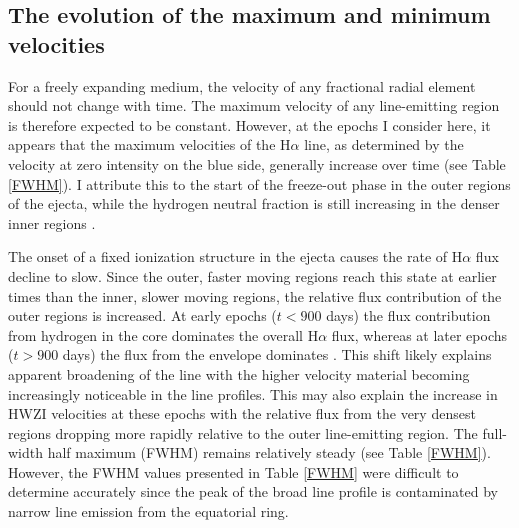 \subsection{The evolution of the maximum and minimum velocities}

For a freely expanding medium, the velocity of any fractional radial 
element should not change with time.  The maximum velocity of any 
line-emitting region is therefore expected to be constant.  However, at 
the epochs I consider here, it appears that the maximum velocities of the 
H$\alpha$ line, as determined by the velocity at zero intensity on the 
blue side, generally increase over time (see Table \ref{FWHM}).  I 
attribute this to the start of the freeze-out phase in the outer regions 
of the ejecta, while the hydrogen neutral fraction is still increasing in 
the denser inner regions \citep{Danziger1991,Fransson1993}.

The onset of a fixed ionization structure in the ejecta causes the rate of 
H$\alpha$ flux decline to slow.  Since the outer, faster moving regions 
reach this state at earlier times than the inner, slower moving regions, 
the relative flux contribution of the outer regions is increased.  At 
early epochs ($t<900$ days) the flux contribution from hydrogen in the 
core dominates the overall H$\alpha$ flux, whereas at later epochs ($t > 
900$ days) the flux from the envelope dominates \citep{Fransson1993, 
Kozma1998a}.  This shift likely explains apparent broadening of the line 
with the higher velocity material becoming increasingly noticeable in the 
line profiles.  This may also explain the increase in HWZI velocities at 
these epochs with the relative flux from the very densest regions dropping 
more rapidly relative to the outer line-emitting region. The full-width 
half maximum (FWHM) remains relatively steady (see Table 
\ref{FWHM}). However, the FWHM values presented in Table \ref{FWHM} were difficult 
to determine accurately since the peak of the broad line profile is 
contaminated by narrow line emission from the equatorial ring.


